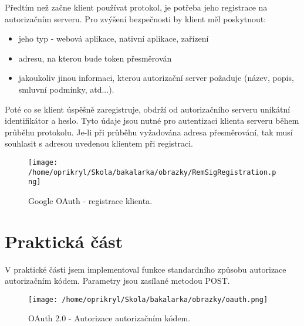 \documentclass[]{fithesis3}
\begin{document}
	Předtím než začne klient používat protokol, je potřeba jeho registrace na autorizačním serveru. 	Pro zvýšení bezpečnosti by klient měl poskytnout:

	\begin{itemize}
  		\item jeho typ - webová aplikace, nativní aplikace, zařízení
		\item adresu, na kterou bude token přesměrován
		\item jakoukoliv jinou informaci, kterou autorizační server požaduje (název, popis, smluvní 				podmínky, atd...).
	\end{itemize}

	Poté co se klient úspěšně zaregistruje, obdrží od autorizačního serveru unikátní identifikátor a 		heslo. Tyto údaje jsou nutné pro autentizaci klienta serveru během průběhu protokolu. Je-li při 		průběhu vyžadována adresa přesměrování, tak musí souhlasit s adresou uvedenou klientem při 	registraci.

	\begin{figure}[!ht]
  		\begin{minipage}{1.00\textwidth}
    			\texttt{[image: /home/oprikryl/Skola/bakalarka/obrazky/RemSigRegistration.png]}
  		\end{minipage}
 		\caption{Google OAuth - registrace klienta.}
  		\label{fig:Google OAuth - registrace klienta.}
	\end{figure}	
	\newpage

	\section{Praktická část}

	V praktické části jsem implementoval funkce standardního způsobu autorizace 					autorizačním kódem. Parametry jsou zasílané metodou POST.

	\begin{figure}[!ht]
		\begin{center}
  		\begin{minipage}{1.00\textwidth}
    			\texttt{[image: /home/oprikryl/Skola/bakalarka/obrazky/oauth.png]}
  		\end{minipage}
		\end{center}
 		\caption{OAuth 2.0 - Autorizace autorizačním kódem.}
  		\label{fig:oauth}
	\end{figure}
\end{document}

